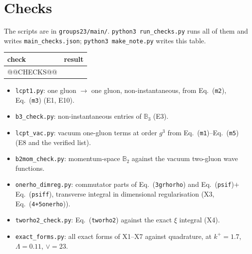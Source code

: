 \documentclass[10pt]{article}
\def\mf#1{\mathbb{#1}}
\newcommand{\eqn}[1]{Eq.~(\texttt{#1})}
\begin{document}
\section{Checks}\label{sec:checks}
The scripts are in \texttt{groups23/main/}. \texttt{python3 run\_checks.py} runs all of them and writes \texttt{main\_checks.json}; \texttt{python3 make\_note.py} writes this table.
\begin{center}\small
\begin{longtable}{@{}p{}p{}@{}}
\toprule
check & result\\ \midrule
@@CHECKS@@
\bottomrule
\end{longtable}
\end{center}
\begin{itemize}
\item \texttt{lcpt1.py}: one gluon $\to$ one gluon, non-instantaneous, from \eqn{m2}, \eqn{m3} (E1, E10).
\item \texttt{b3\_check.py}: non-instantaneous entries of $\mf B_3$ (E3).
\item \texttt{lcpt\_vac.py}: vacuum one-gluon terms at order $g^3$ from \eqn{m1}--\eqn{m5} (E8 and the verified list).
\item \texttt{b2mom\_check.py}: momentum-space $\mf B_2$ against the vacuum two-gluon wave functions.
\item \texttt{onerho\_dimreg.py}: commutator parts of \eqn{3grhorho} and \eqn{psif}$+$\eqn{psiff}, transverse integral in dimensional regularisation (X3, \eqn{4+5onerho}).
\item \texttt{tworho2\_check.py}: \eqn{tworho2} against the exact $\xi$ integral (X4).
\item \texttt{exact\_forms.py}: all exact forms of X1--X7 against quadrature, at $k^+=1.7$, $\Lambda=0.11$, $\vee=23$.
\end{itemize}
\end{document}
